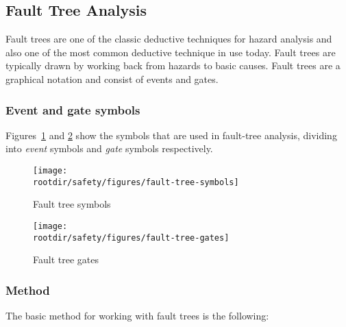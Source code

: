 \subsection{Fault Tree Analysis}

Fault trees are one of the classic deductive techniques for hazard analysis and also one of the most common deductive technique in  use today. Fault trees are typically drawn by working back from hazards to basic causes.  Fault trees are a graphical notation and consist of events and gates.

\subsubsection*{Event and gate symbols}

Figures~\ref{fig:safety:fault-tree-symbols} and \ref{fig:safety-fault-tree-gates} show the symbols that are used in fault-tree analysis, dividing into \emph{event} symbols and \emph{gate} symbols respectively.

\begin{figure}[!h]
  \centering
  \texttt{[image: \\rootdir/safety/figures/fault-tree-symbols]}
  \caption{Fault tree symbols}
  \label{fig:safety:fault-tree-symbols}
\end{figure}

\begin{figure}[!h]
  \centering
  \texttt{[image: \\rootdir/safety/figures/fault-tree-gates]}
  \caption{Fault tree gates}
  \label{fig:safety-fault-tree-gates}
\end{figure}

\subsubsection*{Method}

The basic method for working with fault trees is the following:

